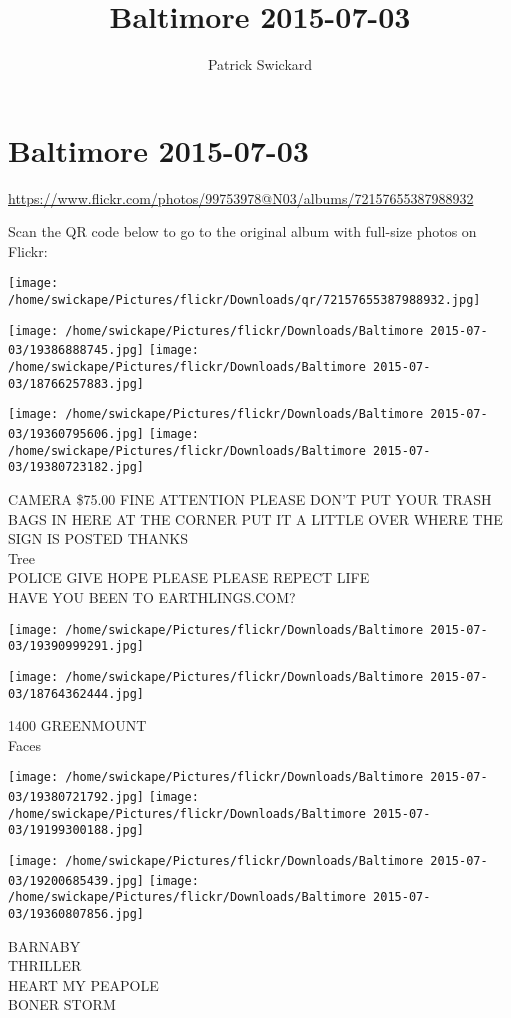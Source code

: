 \documentclass[10pt,letterpaper]{article}
\title{Baltimore 2015-07-03}
\author{Patrick Swickard}
\date{}
\begin{document}
\section*{Baltimore 2015-07-03}

\url{https://www.flickr.com/photos/99753978@N03/albums/72157655387988932}

Scan the QR code below to go to the original album with full-size photos on Flickr:

\texttt{[image: /home/swickape/Pictures/flickr/Downloads/qr/72157655387988932.jpg]}
\pagebreak

\texttt{[image: /home/swickape/Pictures/flickr/Downloads/Baltimore 2015-07-03/19386888745.jpg]}
\texttt{[image: /home/swickape/Pictures/flickr/Downloads/Baltimore 2015-07-03/18766257883.jpg]}

\texttt{[image: /home/swickape/Pictures/flickr/Downloads/Baltimore 2015-07-03/19360795606.jpg]}
\texttt{[image: /home/swickape/Pictures/flickr/Downloads/Baltimore 2015-07-03/19380723182.jpg]}

CAMERA \$75.00 FINE ATTENTION PLEASE DON'T PUT YOUR TRASH BAGS IN HERE AT THE CORNER PUT IT A LITTLE OVER WHERE THE SIGN IS POSTED THANKS\\
Tree\\
POLICE GIVE HOPE PLEASE PLEASE REPECT LIFE\\
HAVE YOU BEEN TO EARTHLINGS.COM?
\pagebreak

\texttt{[image: /home/swickape/Pictures/flickr/Downloads/Baltimore 2015-07-03/19390999291.jpg]}

\vspace{0.25in}
\texttt{[image: /home/swickape/Pictures/flickr/Downloads/Baltimore 2015-07-03/18764362444.jpg]}

1400 GREENMOUNT\\
Faces
\pagebreak

\texttt{[image: /home/swickape/Pictures/flickr/Downloads/Baltimore 2015-07-03/19380721792.jpg]}
\texttt{[image: /home/swickape/Pictures/flickr/Downloads/Baltimore 2015-07-03/19199300188.jpg]}

\texttt{[image: /home/swickape/Pictures/flickr/Downloads/Baltimore 2015-07-03/19200685439.jpg]}
\texttt{[image: /home/swickape/Pictures/flickr/Downloads/Baltimore 2015-07-03/19360807856.jpg]}

BARNABY\\
THRILLER\\
HEART MY PEAPOLE\\
BONER STORM
\pagebreak
\end{document}
